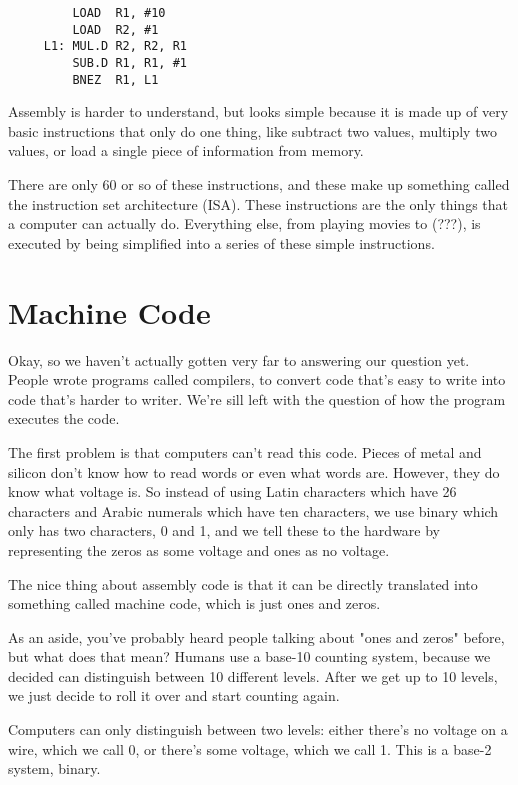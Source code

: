 \documentclass{IEEEtran}
\begin{document}
\scriptsize
\begin{verbatim}
         LOAD  R1, #10     
         LOAD  R2, #1       
     L1: MUL.D R2, R2, R1   
         SUB.D R1, R1, #1      
         BNEZ  R1, L1
\end{verbatim}
\normalsize

Assembly is harder to understand, but looks simple because it is made up of very basic instructions that only do one thing, like subtract two values, multiply two values, or load a single piece of information from memory.  \medskip

There are only 60 or so of these instructions, and these make up something called the instruction set architecture (ISA). These instructions are the only things that a computer can actually do. Everything else, from playing movies to (???), is executed by being simplified into a series of these simple instructions. \medskip

\section{Machine Code}

Okay, so we haven't actually gotten very far to answering our question yet. People wrote programs called compilers, to convert code that's easy to write into code that's harder to writer. We're sill left with the question of how the program executes the code. \medskip

The first problem is that computers can't read this code. Pieces of metal and silicon don't know how to read words or even what words are. However, they do know what voltage is. So instead of using Latin characters which have 26 characters and Arabic numerals which have ten characters, we use binary which only has two characters, 0 and 1, and we tell these to the hardware by representing the zeros as some voltage and ones as no voltage. \medskip

 The nice thing about assembly code is that it can be directly translated into something called machine code, which is just ones and zeros. \medskip

As an aside, you've probably heard people talking about "ones and zeros" before, but what does that mean? Humans use a base-10 counting system, because we decided can distinguish between 10 different levels. After we get up to 10 levels, we just decide to roll it over and start counting again. \medskip

Computers can only distinguish between two levels: either there's no voltage on a wire, which we call 0, or there's some voltage, which we call 1. This is a base-2 system, binary. \medskip
\end{document}
